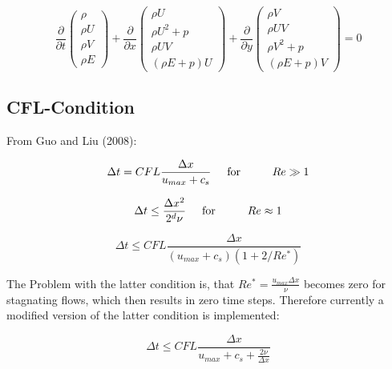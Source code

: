 \documentclass[
	pdftex,             %
	12pt,				%
	a4paper,		   	%
	english,				%
	oneside,			%
]{article}
\begin{document}
\begin{equation}
\dfrac{\partial}{\partial t}
\begin{pmatrix}
\rho \\ \rho U \\ \rho V \\ \rho E
\end{pmatrix}
+
\dfrac{\partial}{\partial x}
\begin{pmatrix}
\rho U \\ \rho U^2 + p \\ \rho U V \\ (\rho E + p)U
\end{pmatrix}
+
\dfrac{\partial}{\partial y}
\begin{pmatrix}
\rho V \\ \rho U V \\ \rho V^2 + p \\ (\rho E + p)V
\end{pmatrix}
=0
\end{equation}

\subsection{CFL-Condition}

From Guo and Liu (2008):

\begin{equation}
\Delta t = CFL \dfrac{\Delta x}{u_{max} + c_s}
\hspace{0.5cm} \textnormal{for} \hspace{1cm}
Re \gg 1
\end{equation}

\begin{equation}
\Delta t \leq \dfrac{\Delta x^2}{2^d \nu}
\hspace{0.5cm} \textnormal{for} \hspace{1cm}
Re \approx 1
\end{equation}

\begin{equation}
\Delta t \leq CFL \dfrac{\Delta x}{(u_{max} + c_s)(1 + 2/Re^*)}
\end{equation}

The Problem with the latter condition is, that $Re^* = \frac{u_{max} \Delta x}{\nu}$ becomes zero for stagnating flows, which then results in zero time steps. Therefore currently a modified version of the latter condition is implemented:

\begin{equation}
\Delta t \leq CFL \dfrac{\Delta x}{u_{max} + c_s + \frac{2 \nu}{\Delta x}}
\end{equation}
\end{document}
